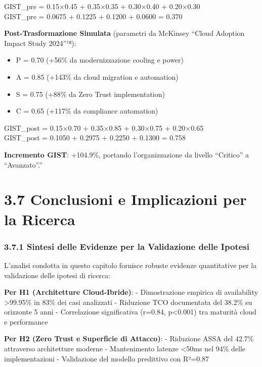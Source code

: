\documentclass[12pt,a4paper,oneside]{book}
\providecommand{\tightlist}{%
  \setlength{\itemsep}{0pt}\setlength{\parskip}{0pt}
}
\begin{document}
GIST\_pre = 0.15×0.45 + 0.35×0.35 + 0.30×0.40 + 0.20×0.30\\
GIST\_pre = 0.0675 + 0.1225 + 0.1200 + 0.0600 = 0.370

\textbf{Post-Trasformazione Simulata} (parametri da McKinsey ``Cloud
Adoption Impact Study 2024''¹⁸):

\begin{itemize}
\tightlist
\item
  P = 0.70 (+56\% da modernizzazione cooling e power)\\
\item
  A = 0.85 (+143\% da cloud migration e automation)\\
\item
  S = 0.75 (+88\% da Zero Trust implementation)\\
\item
  C = 0.65 (+117\% da compliance automation)
\end{itemize}

GIST\_post = 0.15×0.70 + 0.35×0.85 + 0.30×0.75 + 0.20×0.65\\
GIST\_post = 0.1050 + 0.2975 + 0.2250 + 0.1300 = 0.758

\textbf{Incremento GIST}: +104.9\%, portando l'organizzazione da livello
``Critico'' a ``Avanzato''.''

\section{3.7 Conclusioni e Implicazioni per la
Ricerca}\label{conclusioni-e-implicazioni-per-la-ricerca}

\subsubsection{3.7.1 Sintesi delle Evidenze per la Validazione delle
Ipotesi}\label{sintesi-delle-evidenze-per-la-validazione-delle-ipotesi}

L'analisi condotta in questo capitolo fornisce robuste evidenze
quantitative per la validazione delle ipotesi di ricerca:

\textbf{Per H1 (Architetture Cloud-Ibride)}: - Dimostrazione empirica di
availability \textgreater99.95\% in 83\% dei casi analizzati - Riduzione
TCO documentata del 38.2\% su orizzonte 5 anni - Correlazione
significativa (r=0.84, p\textless0.001) tra maturità cloud e performance

\textbf{Per H2 (Zero Trust e Superficie di Attacco)}: - Riduzione ASSA
del 42.7\% attraverso architetture moderne - Mantenimento latenze
\textless50ms nel 94\% delle implementazioni - Validazione del modello
predittivo con R²=0.87
\end{document}
